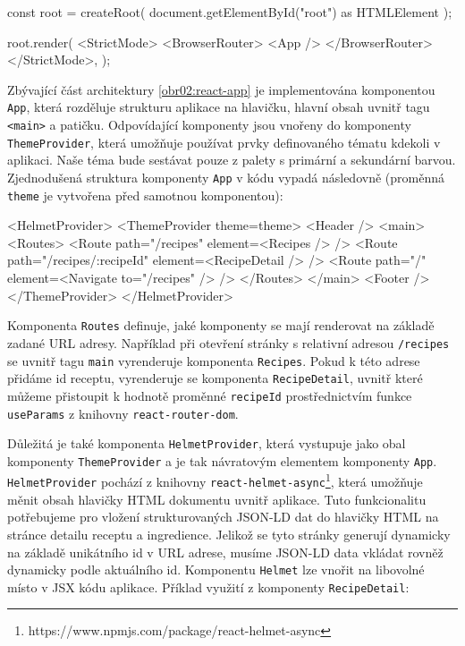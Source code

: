 \begingroup
\samepage
\begin{code}
const root = createRoot(
    document.getElementById("root") as HTMLElement
);

root.render(
  <StrictMode>
    <BrowserRouter>
      <App />
    </BrowserRouter>
  </StrictMode>,
);
\end{code}
\endgroup

Zbývající část architektury \ref{obr02:react-app} je implementována komponentou \texttt{App}, která rozděluje strukturu aplikace na hlavičku, hlavní obsah uvnitř tagu \texttt{<main>} a patičku. Odpovídající komponenty jsou vnořeny do komponenty \texttt{ThemeProvider}, která umožňuje používat prvky definovaného tématu kdekoli v aplikaci. Naše téma bude sestávat pouze z palety s primární a sekundární barvou. Zjednodušená struktura komponenty \texttt{App} v kódu vypadá následovně (proměnná \texttt{theme} je vytvořena před samotnou komponentou):

\begingroup
\samepage
\begin{code}
<HelmetProvider>
  <ThemeProvider theme={theme}>
    <Header />
    <main>
      <Routes>
        <Route path="/recipes" element={<Recipes />} />
        <Route path="/recipes/:recipeId" element={<RecipeDetail />} />
        <Route path="/" element={<Navigate to="/recipes" />} />
      </Routes>
    </main>
    <Footer />
  </ThemeProvider>
</HelmetProvider>
\end{code}
\endgroup

Komponenta \texttt{Routes} definuje, jaké komponenty se mají renderovat na základě zadané URL adresy. Například při otevření stránky s relativní adresou \texttt{/recipes} se uvnitř tagu \texttt{main} vyrenderuje komponenta \texttt{Recipes}. Pokud k této adrese přidáme id receptu, vyrenderuje se komponenta \texttt{RecipeDetail}, uvnitř které můžeme přistoupit k hodnotě proměnné \texttt{recipeId} prostřednictvím funkce \texttt{useParams} z knihovny \texttt{react-router-dom}.

Důležitá je také komponenta \texttt{HelmetProvider}, která vystupuje jako obal komponenty \texttt{ThemeProvider} a je tak návratovým elementem komponenty \texttt{App}. \texttt{HelmetProvider} pochází z knihovny \texttt{react-helmet-async}\footnote{https://www.npmjs.com/package/react-helmet-async}, která umožňuje měnit obsah hlavičky HTML dokumentu uvnitř aplikace. Tuto funkcionalitu potřebujeme pro vložení strukturovaných JSON-LD dat do hlavičky HTML na stránce detailu receptu a ingredience. Jelikož se tyto stránky generují dynamicky na základě unikátního id v URL adrese, musíme JSON-LD data vkládat rovněž dynamicky podle aktuálního id. Komponentu \texttt{Helmet} lze vnořit na libovolné místo v JSX kódu aplikace. Příklad využití z komponenty \texttt{RecipeDetail}:

